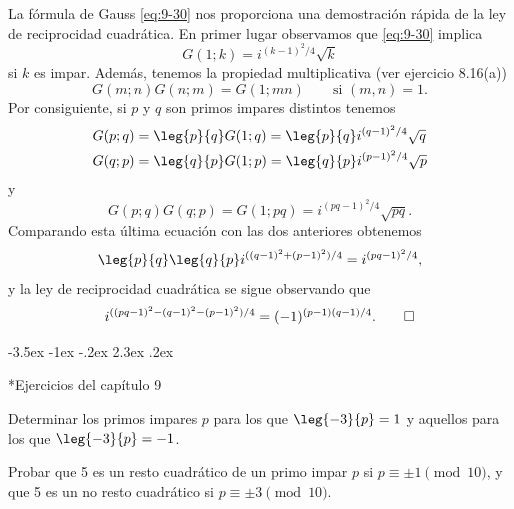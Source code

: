 \documentclass[12pt,a4paper]{book}
\makeatletter
\renewcommand\section{\@startsection{section}{1}{\z@}%
  {-3.5ex \@plus -1ex \@minus -.2ex}%
  {2.3ex \@plus .2ex}%
  {\normalfont\Large\bfseries\raggedright}}
\makeatother
\begin{document}
    La fórmula de Gauss \eqref{eq:9-30} nos proporciona una demostración rápida de la ley
    de reciprocidad cuadrática. En primer lugar observamos que \eqref{eq:9-30} implica
    \begin{equation*}
        G(1;k)=i^{(k-1)^{2}/4}\sqrt{k}
    \end{equation*}
    si $k$ es impar. Además, tenemos la propiedad multiplicativa (ver ejercicio 8.16(a))
    \begin{equation*}
        G(m;n)G(n;m)=G(1;mn)\qquad\text{si }(m,n)=1.
    \end{equation*}
    Por consiguiente, si $p$ y $q$ son primos impares distintos tenemos
    \begin{align*}
        G(p;q)&=\leg{p}{q}G(1;q)=\leg{p}{q}i^{(q-1)^{2}/4}\sqrt{q}\\
        G(q;p)&=\leg{q}{p}G(1;p)=\leg{q}{p}i^{(p-1)^{2}/4}\sqrt{p}
    \end{align*}
    y
    \begin{equation*}
        G(p;q)G(q;p)=G(1;pq)=i^{(pq-1)^{2}/4}\sqrt{pq}.
    \end{equation*}
    Comparando esta última ecuación con las dos anteriores obtenemos
    \begin{equation*}
        \leg{p}{q}\leg{q}{p}i^{((q-1)^{2}+(p-1)^{2})/4}=i^{(pq-1)^{2}/4},
    \end{equation*}
    y la ley de reciprocidad cuadrática se sigue observando que
    \begin{equation*}
        i^{((pq-1)^{2}-(q-1)^{2}-(p-1)^{2})/4}=(-1)^{(p-1)(q-1)/4}.\qedhere
    \end{equation*}

    \section*{Ejercicios del capítulo 9}

    \begin{ejercicio}
        Determinar los primos impares $p$ para los que $\leg{-3}{p}=1$ y aquellos para los
        que $\leg{-3}{p}=-1$.
    \end{ejercicio}

    \begin{ejercicio}
        Probar que 5 es un resto cuadrático de un primo impar $p$ si $p\equiv\pm1\pmod{10}$,
        y que 5 es un no resto cuadrático si $p\equiv\pm3\pmod{10}$.
    \end{ejercicio}
\end{document}
